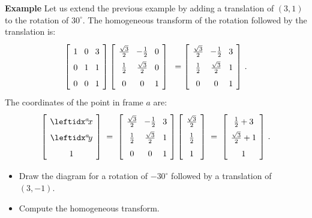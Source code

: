\noindent\textbf{Example} Let us extend the previous example by adding a translation of $(3,1)$ to the rotation of $30^\circ$. The homogeneous transform of the rotation followed by the translation is:
\[
\spacearray
\left[\begin{array}{ccc}1&0&3\\0&1&1\\0&0&1\end{array}\right]
\left[\begin{array}{ccc}\frac{\sqrt{3}}{2}&-\frac{1}{2}&0\\\frac{1}{2}&\frac{\sqrt{3}}{2}&0\\0&0&1\end{array}\right]\;\;=
\left[\begin{array}{ccc}\frac{\sqrt{3}}{2}&-\frac{1}{2}&3\\\frac{1}{2}&\frac{\sqrt{3}}{2}&1\\0&0&1\end{array}\right]\,.
\]
The coordinates of the point in frame $a$ are:
\[
\spacearray
\left[\begin{array}{c}\ax\\\ay\\1\end{array}\right]\;=\;
\left[\begin{array}{ccc}\frac{\sqrt{3}}{2}&-\frac{1}{2}&3\\\frac{1}{2}&\frac{\sqrt{3}}{2}&1\\0&0&1\end{array}\right]
\left[\begin{array}{c}\frac{\sqrt{3}}{2}\\\frac{1}{2}\\1\end{array}\right]\;=\;
\left[\begin{array}{c}\frac{1}{2}+3\\\frac{\sqrt{3}}{2}+1\\1\end{array}\right]\,.
\]

\begin{framed}

\begin{itemize}
\item Draw the diagram for a rotation of $-30^\circ$ followed by a translation of $(3,-1)$.
\item Compute the homogeneous transform.
\end{itemize}
\end{framed}

